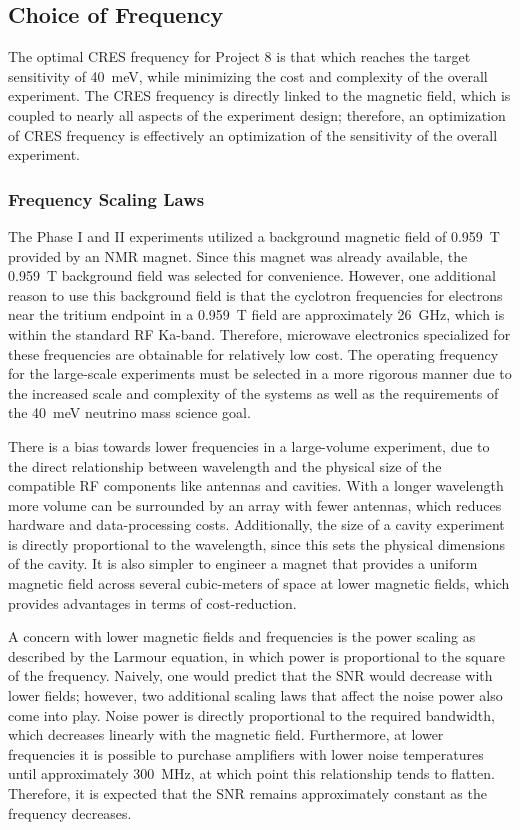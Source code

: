 \subsection{Choice of Frequency}
The optimal CRES frequency for Project 8 is that which reaches the target sensitivity of 40~meV, while minimizing the cost and complexity of the overall experiment. The CRES frequency is directly linked to the magnetic field, which is coupled to nearly all aspects of the experiment design; therefore, an optimization of CRES frequency is effectively an optimization of the sensitivity of the overall experiment.

\subsubsection*{Frequency Scaling Laws}

The Phase I and II experiments utilized a background magnetic field of 0.959~T provided by an NMR magnet. Since this magnet was already available, the 0.959~T background field was selected for convenience. However, one additional reason to use this background field is that the cyclotron frequencies for electrons near the tritium endpoint in a 0.959~T field are approximately 26~GHz, which is within the standard RF Ka-band. Therefore, microwave electronics specialized for these frequencies are obtainable for relatively low cost. The operating frequency for the large-scale experiments must be selected in a more rigorous manner due to the increased scale and complexity of the systems as well as the requirements of the 40~meV neutrino mass science goal.

There is a bias towards lower frequencies in a large-volume experiment, due to the direct relationship between wavelength and the physical size of the compatible RF components like antennas and cavities. With a longer wavelength more volume can be surrounded by an array with fewer antennas, which reduces hardware and data-processing costs. Additionally, the size of a cavity experiment is directly proportional to the wavelength, since this sets the physical dimensions of the cavity. It is also simpler to engineer a magnet that provides a uniform magnetic field across several cubic-meters of space at lower magnetic fields, which provides advantages in terms of cost-reduction.

A concern with lower magnetic fields and frequencies is the power scaling as described by the Larmour equation, in which power is proportional to the square of the frequency. Naively, one would predict that the SNR would decrease with lower fields; however, two additional scaling laws that affect the noise power also come into play. Noise power is directly proportional to the required bandwidth, which decreases linearly with the magnetic field. Furthermore, at lower frequencies it is possible to purchase amplifiers with lower noise temperatures until approximately 300~MHz, at which point this relationship tends to flatten. Therefore, it is expected that the SNR remains approximately constant as the frequency decreases.

